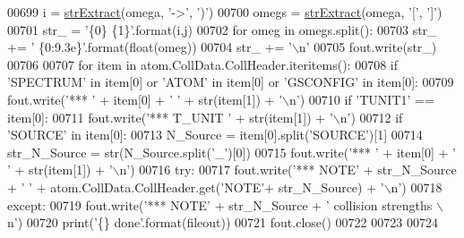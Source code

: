 \begin{DoxyCode}
00699         i = \hyperlink{namespacepyneb_1_1utils_1_1misc_aaf9c5249e3c3104e38854ca30f9df4b7}{strExtract}(omega, \textcolor{stringliteral}{'->'}, \textcolor{stringliteral}{')'})
00700         omegs = \hyperlink{namespacepyneb_1_1utils_1_1misc_aaf9c5249e3c3104e38854ca30f9df4b7}{strExtract}(omega, \textcolor{stringliteral}{'['}, \textcolor{stringliteral}{']'})
00701         str\_ = \textcolor{stringliteral}{'\{0\} \{1\}'}.format(i,j)
00702         \textcolor{keywordflow}{for} omeg \textcolor{keywordflow}{in} omegs.split():
00703             str\_ += \textcolor{stringliteral}{' \{0:9.3e\}'}.format(float(omeg))
00704         str\_ += \textcolor{stringliteral}{'\(\backslash\)n'}
00705         fout.write(str\_)
00706         
00707     \textcolor{keywordflow}{for} item \textcolor{keywordflow}{in} atom.CollData.CollHeader.iteritems():
00708         \textcolor{keywordflow}{if} \textcolor{stringliteral}{'SPECTRUM'} \textcolor{keywordflow}{in} item[0] \textcolor{keywordflow}{or} \textcolor{stringliteral}{'ATOM'} \textcolor{keywordflow}{in} item[0] \textcolor{keywordflow}{or} \textcolor{stringliteral}{'GSCONFIG'} \textcolor{keywordflow}{in} item[0]:
00709             fout.write(\textcolor{stringliteral}{'*** '} + item[0] + \textcolor{stringliteral}{' '} + str(item[1]) + \textcolor{stringliteral}{'\(\backslash\)n'})
00710         \textcolor{keywordflow}{if} \textcolor{stringliteral}{'TUNIT1'} == item[0]:
00711             fout.write(\textcolor{stringliteral}{'*** T\_UNIT '} + str(item[1]) + \textcolor{stringliteral}{'\(\backslash\)n'}) 
00712         \textcolor{keywordflow}{if} \textcolor{stringliteral}{'SOURCE'} \textcolor{keywordflow}{in} item[0]:
00713             N\_Source = item[0].split(\textcolor{stringliteral}{'SOURCE'})[1]
00714             str\_N\_Source = str(N\_Source.split(\textcolor{stringliteral}{'\_'})[0])
00715             fout.write(\textcolor{stringliteral}{'*** '} + item[0] + \textcolor{stringliteral}{' '} + str(item[1]) + \textcolor{stringliteral}{'\(\backslash\)n'})
00716             \textcolor{keywordflow}{try}:
00717                 fout.write(\textcolor{stringliteral}{'*** NOTE'} + str\_N\_Source + \textcolor{stringliteral}{' '} + atom.CollData.CollHeader.get(\textcolor{stringliteral}{'NOTE'}+
      str\_N\_Source)  + \textcolor{stringliteral}{'\(\backslash\)n'})
00718             \textcolor{keywordflow}{except}:
00719                 fout.write(\textcolor{stringliteral}{'*** NOTE'} + str\_N\_Source + \textcolor{stringliteral}{' collision strengths \(\backslash\)n'})
00720     print(\textcolor{stringliteral}{'\{\} done'}.format(fileout))
00721     fout.close()
00722     
00723     
00724     
\end{DoxyCode}
